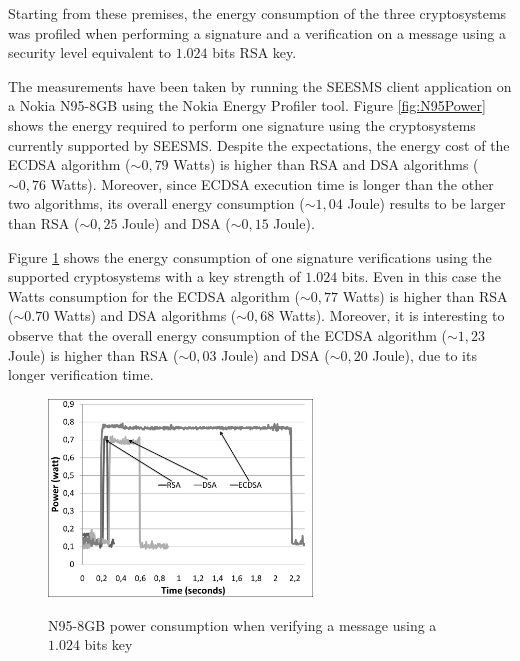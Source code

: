 \documentclass[authoryear]{elsarticle}
\begin{document}
Starting from these premises,  the energy consumption of the three cryptosystems was profiled when performing a signature and a verification on a message using a security level equivalent to $1.024$ bits RSA key.

The measurements have been taken by running the SEESMS client application on a Nokia N95-8GB using the Nokia Energy Profiler tool. Figure \ref{fig:N95Power} shows the energy required to perform one signature using the cryptosystems currently supported by SEESMS. Despite the expectations, the energy cost of the ECDSA algorithm ($\sim0,79$ Watts) is higher than RSA and DSA algorithms ($\sim0,76$ Watts). Moreover, since ECDSA execution time is longer than the other two algorithms, its overall energy consumption ($\sim1,04$ Joule) results to be larger than RSA ($\sim0,25$ Joule) and DSA ($\sim0,15$ Joule).
\newpage


Figure \ref{fig:N95PowerVerify} shows the energy consumption of one signature verifications using the supported cryptosystems with a key strength of $1.024$ bits. Even in this case the Watts consumption for the ECDSA algorithm ($\sim 0,77$ Watts) is higher than RSA ($\sim0.70$ Watts) and DSA algorithms ($\sim 0,68$ Watts). Moreover, it is interesting to observe that the overall energy consumption of the ECDSA algorithm ($\sim1,23$ Joule) is higher than RSA ($\sim 0,03$ Joule) and DSA ($\sim0,20$ Joule), due to its longer verification time.

\begin{figure}[ht]
\begin{center}
  \includegraphics[width=7cm]{immagini/N95PowerVerify.pdf}\\
  \caption{N95-8GB power consumption when verifying a message using a $1.024$ bits key}
  \label{fig:N95PowerVerify}
\end{center}
\end{figure}
\end{document}
